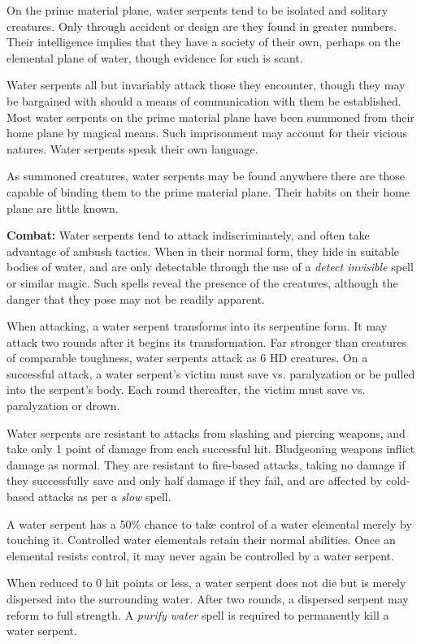 \begin{multicols}{2}
On the prime material plane, water serpents tend to be isolated and solitary creatures. Only through accident or design are they found in greater numbers. Their intelligence implies that they have a society of their own, perhaps on the elemental plane of water, though evidence for such is scant.

Water serpents all but invariably attack those they encounter, though they may be bargained with should a means of communication with them be established. Most water serpents on the prime material plane have been summoned from their home plane by magical means. Such imprisonment may account for their vicious natures. Water serpents speak their own language.

As summoned creatures, water serpents may be found anywhere there are those capable of binding them to the prime material plane. Their habits on their home plane are little known.

\textbf{Combat:} Water serpents tend to attack indiscriminately, and often take advantage of ambush tactics. When in their normal form, they hide in suitable bodies of water, and are only detectable through the use of a \textit{detect invisible} spell or similar magic. Such spells reveal the presence of the creatures, although the danger that they pose may not be readily apparent.

When attacking, a water serpent transforms into its serpentine form. It may attack two rounds after it begins its transformation. Far stronger than creatures of comparable toughness, water serpents attack as 6 HD creatures. On a successful attack, a water serpent's victim must save vs. paralyzation or be pulled into the serpent's body. Each round thereafter, the victim must save vs. paralyzation or drown.

Water serpents are resistant to attacks from slashing and piercing weapons, and take only 1 point of damage from each successful hit. Bludgeoning weapons inflict damage as normal. They are resistant to fire-based attacks, taking no damage if they successfully save and only half damage if they fail, and are affected by cold-based attacks as per a \textit{slow} spell. 

A water serpent has a 50\% chance to take control of a water elemental merely by touching it. Controlled water elementals retain their normal abilities. Once an elemental resists control, it may never again be controlled by a water serpent.

When reduced to 0 hit points or less, a water serpent does not die but is merely dispersed into the surrounding water. After two rounds, a dispersed serpent may reform to full strength. A \textit{purify water} spell is required to permanently kill a water serpent.


\end{multicols}
